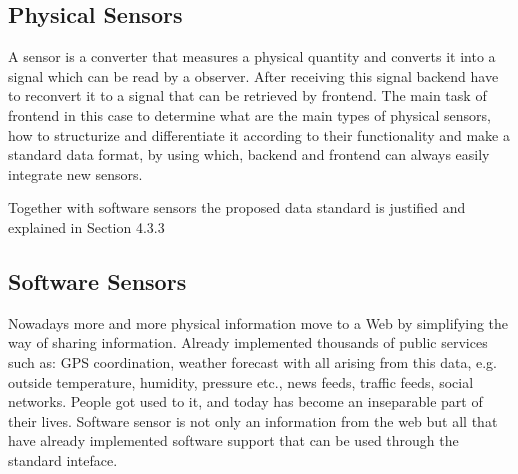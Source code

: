 	\subsection {Physical Sensors}
	A sensor is a converter that measures a physical quantity and converts it into a signal which can be read by a observer. After receiving this signal backend have to reconvert it to a signal that can be retrieved by frontend. The main task of frontend in this case to determine what are the main types of physical sensors, how to structurize and differentiate it according to their functionality and make a standard data format, by using which, backend and frontend can always easily integrate new sensors.
    
    Together with software sensors the proposed data standard is justified and explained in Section 4.3.3

	\subsection {Software Sensors}
	Nowadays more and more physical information move to a Web by simplifying the way of sharing information. Already implemented thousands of public services such as: GPS coordination, weather forecast with all arising from this data, e.g. outside temperature, humidity, pressure etc., news feeds, traffic feeds, social networks. People got used to it, and today has become an inseparable part of their lives. Software sensor is not only an information from the web but all that have already implemented software support that can be used through the standard inteface.
	
